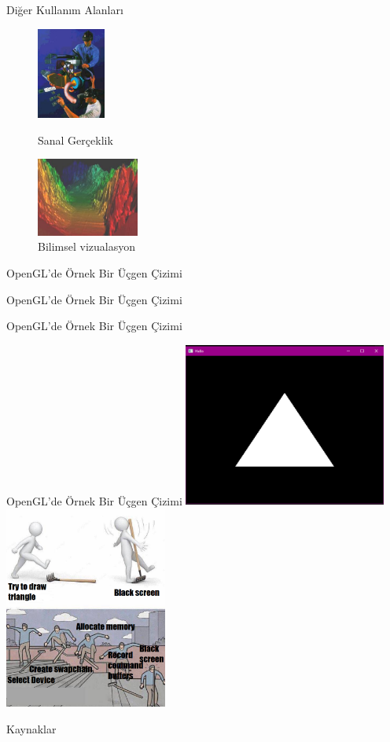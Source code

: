 \documentclass{beamer}
\begin{document}
\begin{frame}{Diğer Kullanım Alanları}
\begin{figure}
\includegraphics[width=0.2\textwidth]{SanalGerçeklik.jpg}
\caption{Sanal Gerçeklik}
\includegraphics[width=0.3\textwidth]{bilimsel vizualasyon.jpg}
\caption{Bilimsel vizualasyon}
\end{figure}
\end{frame}

\begin{frame}{OpenGL'de Örnek Bir Üçgen Çizimi}

\end{frame}

\begin{frame}{OpenGL'de Örnek Bir Üçgen Çizimi}

\end{frame}

\begin{frame}{OpenGL'de Örnek Bir Üçgen Çizimi}

\end{frame}

\begin{frame}{OpenGL'de Örnek Bir Üçgen Çizimi}
\includegraphics[width=0.5\textwidth]{backgrounds/triangle.png}
\includegraphics[width=0.4\textwidth]{ouch.png}
\caption{}
\end{frame}




\begin{frame}[allowframebreaks]{Kaynaklar}
  
  \scriptsize
  
\end{frame}
\end{document}
